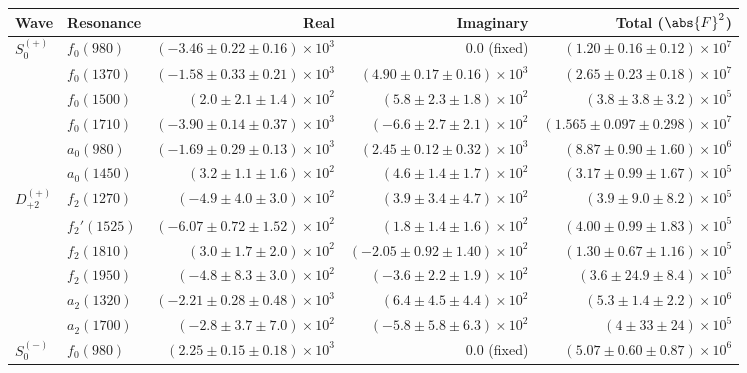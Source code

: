 \begin{table}[ht]
    \begin{center}
        \begin{tabular}{llrrr}\toprule
        Wave & Resonance & Real & Imaginary & Total ($\abs{F}^2$) \\\midrule
$S_{0}^{(+)}$ & $f_{0}(980)$ & $(-3.46 \pm 0.22 \pm 0.16) \times 10^{3}$ & $0.0$ (fixed) & $(1.20 \pm 0.16 \pm 0.12) \times 10^{7}$ \\
 & $f_{0}(1370)$ & $(-1.58 \pm 0.33 \pm 0.21) \times 10^{3}$ & $(4.90 \pm 0.17 \pm 0.16) \times 10^{3}$ & $(2.65 \pm 0.23 \pm 0.18) \times 10^{7}$ \\
 & $f_{0}(1500)$ & $(2.0 \pm 2.1 \pm 1.4) \times 10^{2}$ & $(5.8 \pm 2.3 \pm 1.8) \times 10^{2}$ & $(3.8 \pm 3.8 \pm 3.2) \times 10^{5}$ \\
 & $f_{0}(1710)$ & $(-3.90 \pm 0.14 \pm 0.37) \times 10^{3}$ & $(-6.6 \pm 2.7 \pm 2.1) \times 10^{2}$ & $(1.565 \pm 0.097 \pm 0.298) \times 10^{7}$ \\
 & $a_{0}(980)$ & $(-1.69 \pm 0.29 \pm 0.13) \times 10^{3}$ & $(2.45 \pm 0.12 \pm 0.32) \times 10^{3}$ & $(8.87 \pm 0.90 \pm 1.60) \times 10^{6}$ \\
 & $a_{0}(1450)$ & $(3.2 \pm 1.1 \pm 1.6) \times 10^{2}$ & $(4.6 \pm 1.4 \pm 1.7) \times 10^{2}$ & $(3.17 \pm 0.99 \pm 1.67) \times 10^{5}$ \\
$D_{+2}^{(+)}$ & $f_{2}(1270)$ & $(-4.9 \pm 4.0 \pm 3.0) \times 10^{2}$ & $(3.9 \pm 3.4 \pm 4.7) \times 10^{2}$ & $(3.9 \pm 9.0 \pm 8.2) \times 10^{5}$ \\
 & $f_{2}'(1525)$ & $(-6.07 \pm 0.72 \pm 1.52) \times 10^{2}$ & $(1.8 \pm 1.4 \pm 1.6) \times 10^{2}$ & $(4.00 \pm 0.99 \pm 1.83) \times 10^{5}$ \\
 & $f_{2}(1810)$ & $(3.0 \pm 1.7 \pm 2.0) \times 10^{2}$ & $(-2.05 \pm 0.92 \pm 1.40) \times 10^{2}$ & $(1.30 \pm 0.67 \pm 1.16) \times 10^{5}$ \\
 & $f_{2}(1950)$ & $(-4.8 \pm 8.3 \pm 3.0) \times 10^{2}$ & $(-3.6 \pm 2.2 \pm 1.9) \times 10^{2}$ & $(3.6 \pm 24.9 \pm 8.4) \times 10^{5}$ \\
 & $a_{2}(1320)$ & $(-2.21 \pm 0.28 \pm 0.48) \times 10^{3}$ & $(6.4 \pm 4.5 \pm 4.4) \times 10^{2}$ & $(5.3 \pm 1.4 \pm 2.2) \times 10^{6}$ \\
 & $a_{2}(1700)$ & $(-2.8 \pm 3.7 \pm 7.0) \times 10^{2}$ & $(-5.8 \pm 5.8 \pm 6.3) \times 10^{2}$ & $(4 \pm 33 \pm 24) \times 10^{5}$ \\
$S_{0}^{(-)}$ & $f_{0}(980)$ & $(2.25 \pm 0.15 \pm 0.18) \times 10^{3}$ & $0.0$ (fixed) & $(5.07 \pm 0.60 \pm 0.87) \times 10^{6}$ \\

\end{tabular}
\end{center}
\end{table}
